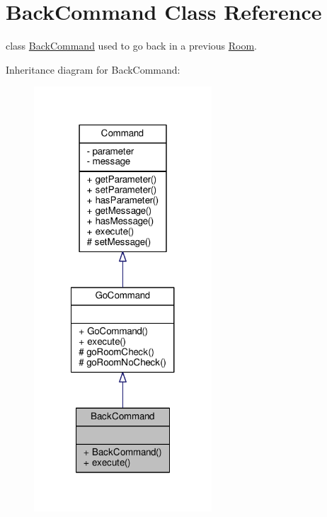 \hypertarget{classBackCommand}{\section{Back\-Command Class Reference}
\label{classBackCommand}
}


class \hyperlink{classBackCommand}{Back\-Command} used to go back in a previous \hyperlink{classRoom}{Room}.  




Inheritance diagram for Back\-Command\-:
\nopagebreak
\begin{figure}[H]
\begin{center}
\leavevmode
\includegraphics[width=188pt]{classBackCommand__inherit__graph}
\end{center}
\end{figure}


